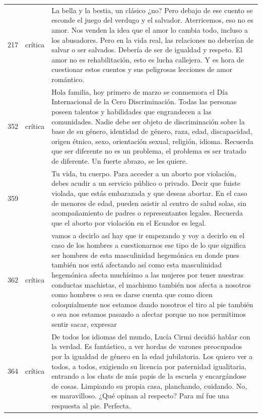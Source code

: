 \begin{longtable}{c>{\raggedright}p{2.0cm}p{12.1cm}}
217 & crítica & La bella y la bestia, un clásico ¿no? Pero debajo de ese cuento se esconde el juego del verdugo y el salvador. Aterricemos, eso no es amor. Nos venden la idea que el amor lo cambia todo, incluso a los abusadores. Pero en la vida real, las relaciones no deberían de salvar o ser salvados. Debería de ser de igualdad y respeto. El amor no es rehabilitación, esto es lucha callejera. Y es hora de cuestionar estos cuentos y sus peligrosas lecciones de amor romántico. \\
352 & crítica & Hola familia, hoy primero de marzo se conmemora el Día Internacional de la Cero Discriminación. Todas las personas poseen talentos y habilidades que engrandecen a las comunidades. Nadie debe ser objeto de discriminación sobre la base de su género, identidad de género, raza, edad, discapacidad, origen étnico, sexo, orientación sexual, religión, idioma. Recuerda que ser diferente no es un problema, el problema es ser tratado de diferente. Un fuerte abrazo, se les quiere. \\
359 &  & Tu vida, tu cuerpo. Para acceder a un aborto por violación, debes acudir a un servicio público o privado. Decir que fuiste violada, que estás embarazada y que deseas abortar. En el caso de menores de edad, pueden asistir al centro de salud solas, sin acompañamiento de padres o representantes legales. Recuerda que el aborto por violación en el Ecuador es legal. \\
362 & crítica & vamos a decirlo así hay que ir empezando y voy a decirlo en el caso de los hombres a cuestionarnos ese tipo de lo que significa ser hombres de esta masculinidad hegemónica en donde pues también nos está afectando así como esta masculinidad hegemónica afecta muchísimo a las mujeres por tener nuestras conductas machistas, el machismo también nos afecta a nosotros como hombres o sea es darse cuenta que como dicen coloquialmente nos estamos dando nosotros el tiro al pie también o sea nos estamos pasando a afectar porque no nos permitimos sentir sacar, expresar \\
364 & crítica & De todos los idiomas del mundo, Lucía Cirmi decidió hablar con la verdad. Es fantástico, a ver hordas de varones preocupados por la igualdad de género en la edad jubilatoria. Los quiero ver a todos, a todos, exigiendo su licencia por paternidad igualitaria, entrando a los chats de más papis de la escuela y encargándose de cosas. Limpiando su propia casa, planchando, cuidando. No, es maravilloso. ¿Qué opinan al respecto? Para mí fue una respuesta al pie. Perfecta. \\

\end{longtable}
